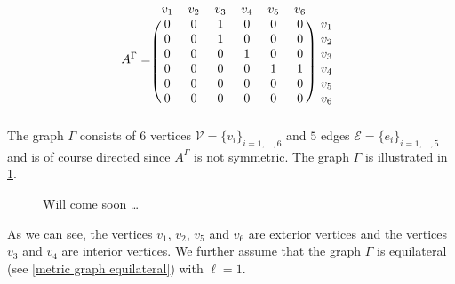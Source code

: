 \begin{equation*}
    A^{\Gamma} = 
    \begin{blockarray}{ccccccc}
        v_1 & v_2 & v_3 & v_4 & v_5 & v_6 \\
        \begin{block}{(cccccc)c}
            0 & 0 & 1 & 0 & 0 & 0 & v_1 \\
            0 & 0 & 1 & 0 & 0 & 0 & v_2 \\
            0 & 0 & 0 & 1 & 0 & 0 & v_3 \\
            0 & 0 & 0 & 0 & 1 & 1 & v_4 \\
            0 & 0 & 0 & 0 & 0 & 0 & v_5 \\
            0 & 0 & 0 & 0 & 0 & 0 & v_6 \\
        \end{block}
    \end{blockarray}
\end{equation*}
The graph $\Gamma$ consists of $6$ vertices $\mathcal{V} = \{ v_i \}_{i = 1,\ldots, 6}$ and $5$ edges $\mathcal{E} = \{ e_i \}_{i = 1,\ldots, 5}$  and is of course directed since $A^{\Gamma}$ is not symmetric. The graph $\Gamma$ is illustrated in \cref{fig7}. 
\begin{figure}[H]
    \begin{center}
    \end{center}
    \caption{Will come soon \ldots}
    \label{fig7}
\end{figure}
As we can see, the vertices $v_1$, $v_2$, $v_5$ and $v_6$ are exterior vertices and the vertices $v_3$ and $v_4$ are interior vertices. We further assume that the graph $\Gamma$ is equilateral (see \cref{metric graph equilateral}) with $\ell = 1$. \\
